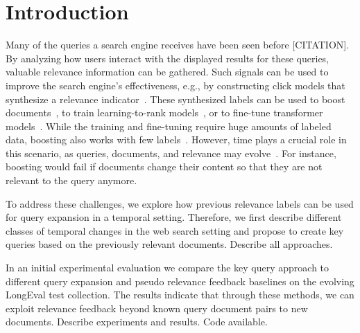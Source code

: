 \section{Introduction}

Many of the queries a search engine receives have been seen before {\color{red}[CITATION]}. By analyzing how users interact with the displayed results for these queries, valuable relevance information can be gathered. Such signals can be used to improve the search engine's effectiveness, e.g., by constructing click models that synthesize a relevance indicator~\cite{chuklin:2015}. These synthesized labels can be used to boost documents~\cite{keller:2024b}, to train learning-to-rank models~\cite{liu:2011}, or to fine-tune transformer models~\cite{lin:2021}. While the training and fine-tuning require huge amounts of labeled data, boosting also works with few labels~\cite{keller:2024b}. However, time plays a crucial role in this scenario, as queries, documents, and relevance may evolve~\cite{keller:2024}. For instance, boosting would fail if documents change their content so that they are not relevant to the query anymore.

To address these challenges, we explore how previous relevance labels can be used for query expansion in a temporal setting. Therefore, we first describe different classes of temporal changes in the web search setting and propose to create key queries based on the previously relevant documents. {\color{red} Describe all approaches.}

In an initial experimental evaluation we compare the key query approach to different query expansion and pseudo relevance feedback baselines on the evolving LongEval test collection. The results indicate that through these methods, we can exploit relevance feedback beyond known query document pairs to new documents. {\color{red} Describe experiments and results. Code available.}






